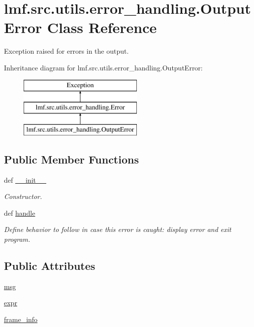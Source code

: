 \hypertarget{classlmf_1_1src_1_1utils_1_1error__handling_1_1_output_error}{\section{lmf.\+src.\+utils.\+error\+\_\+handling.\+Output\+Error Class Reference}
\label{classlmf_1_1src_1_1utils_1_1error__handling_1_1_output_error}
}


Exception raised for errors in the output.  


Inheritance diagram for lmf.\+src.\+utils.\+error\+\_\+handling.\+Output\+Error\+:\begin{figure}[H]
\begin{center}
\leavevmode
\includegraphics[height=3.000000cm]{classlmf_1_1src_1_1utils_1_1error__handling_1_1_output_error}
\end{center}
\end{figure}
\subsection*{Public Member Functions}
\begin{DoxyCompactItemize}
\item 
def \hyperlink{classlmf_1_1src_1_1utils_1_1error__handling_1_1_output_error_ae8b17e571a6cda3419da8e5d157817ac}{\+\_\+\+\_\+init\+\_\+\+\_\+}
\begin{DoxyCompactList}\small\item\em Constructor. \end{DoxyCompactList}\item 
def \hyperlink{classlmf_1_1src_1_1utils_1_1error__handling_1_1_output_error_adacfd84a3c64b1606a39f744f031e1a6}{handle}
\begin{DoxyCompactList}\small\item\em Define behavior to follow in case this error is caught\+: display error and exit program. \end{DoxyCompactList}\end{DoxyCompactItemize}
\subsection*{Public Attributes}
\begin{DoxyCompactItemize}
\item 
\hyperlink{classlmf_1_1src_1_1utils_1_1error__handling_1_1_output_error_a4bdad4fe4219a12ae88039ee8633c316}{msg}
\item 
\hyperlink{classlmf_1_1src_1_1utils_1_1error__handling_1_1_output_error_a0b89f6a37fac3415e278b996f2ba8117}{expr}
\item 
\hyperlink{classlmf_1_1src_1_1utils_1_1error__handling_1_1_output_error_aa9cde9b3f989c8465f12e1b6e3b715bb}{frame\+\_\+info}
\end{DoxyCompactItemize}


